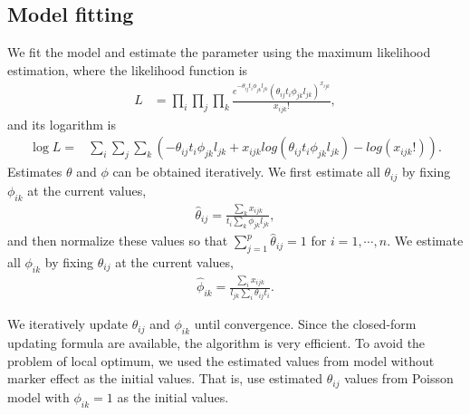 \subsection{Model fitting}
We fit the model  and estimate the parameter using the maximum likelihood estimation, where the   likelihood   function is
\begin{align*}
L & = \prod_i\prod_j\prod_k \frac{e^{-\theta_{ij}t_{i}\phi_{jk}l_{jk}}(\theta_{ij}t_{i}\phi_{jk}l_{jk})^{x_{ijk}}}{x_{ijk}!},
\end{align*}
and its logarithm is 
\begin{align*}
\log L =  &  
\sum_i\sum_j\sum_k (-\theta_{ij}t_{i}\phi_{jk}l_{jk}+x_{ijk}log(\theta_{ij}t_{i}\phi_{jk}l_{jk})-log(x_{ijk}!)).
\end{align*}
Estimates $\theta$ and $\phi$ can be obtained iteratively.  We  first estimate all $\theta_{ij}$ by fixing  $\phi_{ik}$ at the current values, 
\begin{align*}
\hat \theta_{ij} = \frac{\sum_kx_{ijk}}{t_{i}\sum_k\phi_{jk}l_{jk}}, 
\end{align*}
and then normalize these values so that $\sum_{j=1}^p\hat{\theta}_{ij}=1$ for $i=1,\cdots, n$.
We estimate all $\phi_{ik}$ by fixing  $\theta_{ij}$ at the current values, 
\begin{align*}
\hat \phi_{ik} = \frac{\sum_ix_{ijk}}{l_{jk}\sum_i\theta_{ij}t_{i}}.
\end{align*}

We iteratively update  $\theta_{ij}$ and $\phi_{ik}$ until convergence. Since the closed-form updating formula are available, the algorithm is very efficient. To avoid the problem of local optimum, we used the estimated values from model without marker effect as the initial values.  That is, use estimated $\theta_{ij}$ values from Poisson model with $\phi_{ik}=1$ as the initial values.




